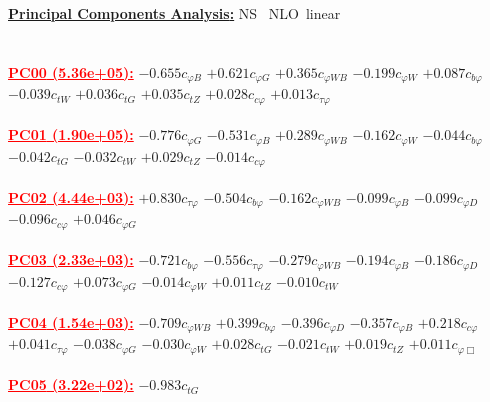 \documentclass{article}
\begin{document}
\noindent \underline{\bf{Principal Components Analysis}:} \rm NS \ NLO\ linear\\ \\ \\
\noindent \textcolor{red}{\underline{\bf{PC00} (5.36e+05):}}
{$-0.655$}{\rm $c_{\varphi B}$}
{$+0.621$}{\rm $c_{\varphi G}$}
{$+0.365$}{\rm $c_{\varphi WB}$}
{$-0.199$}{\rm $c_{\varphi W}$}
{$+0.087$}{\rm $c_{b \varphi}$}
{$-0.039$}{\rm $c_{tW}$}
{$+0.036$}{\rm $c_{tG}$}
{$+0.035$}{\rm $c_{tZ}$}
{$+0.028$}{\rm $c_{c \varphi}$}
{$+0.013$}{\rm $c_{\tau \varphi}$}
 \nonumber \\ \nonumber \\
\noindent \textcolor{red}{\underline{\bf{PC01} (1.90e+05):}}
{$-0.776$}{\rm $c_{\varphi G}$}
{$-0.531$}{\rm $c_{\varphi B}$}
{$+0.289$}{\rm $c_{\varphi WB}$}
{$-0.162$}{\rm $c_{\varphi W}$}
{$-0.044$}{\rm $c_{b \varphi}$}
{$-0.042$}{\rm $c_{tG}$}
{$-0.032$}{\rm $c_{tW}$}
{$+0.029$}{\rm $c_{tZ}$}
{$-0.014$}{\rm $c_{c \varphi}$}
 \nonumber \\ \nonumber \\
\noindent \textcolor{red}{\underline{\bf{PC02} (4.44e+03):}}
{$+0.830$}{\rm $c_{\tau \varphi}$}
{$-0.504$}{\rm $c_{b \varphi}$}
{$-0.162$}{\rm $c_{\varphi WB}$}
{$-0.099$}{\rm $c_{\varphi B}$}
{$-0.099$}{\rm $c_{\varphi D}$}
{$-0.096$}{\rm $c_{c \varphi}$}
{$+0.046$}{\rm $c_{\varphi G}$}
 \nonumber \\ \nonumber \\
\noindent \textcolor{red}{\underline{\bf{PC03} (2.33e+03):}}
{$-0.721$}{\rm $c_{b \varphi}$}
{$-0.556$}{\rm $c_{\tau \varphi}$}
{$-0.279$}{\rm $c_{\varphi WB}$}
{$-0.194$}{\rm $c_{\varphi B}$}
{$-0.186$}{\rm $c_{\varphi D}$}
{$-0.127$}{\rm $c_{c \varphi}$}
{$+0.073$}{\rm $c_{\varphi G}$}
{$-0.014$}{\rm $c_{\varphi W}$}
{$+0.011$}{\rm $c_{tZ}$}
{$-0.010$}{\rm $c_{tW}$}
 \nonumber \\ \nonumber \\
\noindent \textcolor{red}{\underline{\bf{PC04} (1.54e+03):}}
{$-0.709$}{\rm $c_{\varphi WB}$}
{$+0.399$}{\rm $c_{b \varphi}$}
{$-0.396$}{\rm $c_{\varphi D}$}
{$-0.357$}{\rm $c_{\varphi B}$}
{$+0.218$}{\rm $c_{c \varphi}$}
{$+0.041$}{\rm $c_{\tau \varphi}$}
{$-0.038$}{\rm $c_{\varphi G}$}
{$-0.030$}{\rm $c_{\varphi W}$}
{$+0.028$}{\rm $c_{tG}$}
{$-0.021$}{\rm $c_{tW}$}
{$+0.019$}{\rm $c_{tZ}$}
{$+0.011$}{\rm $c_{\varphi \Box}$}
 \nonumber \\ \nonumber \\
\noindent \textcolor{red}{\underline{\bf{PC05} (3.22e+02):}}
{$-0.983$}{\rm $c_{tG}$}
\end{document}
